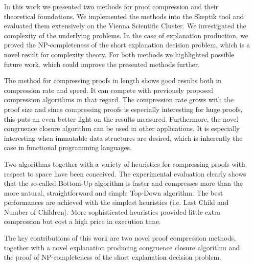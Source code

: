 
In this work we presented two methods for proof compression and their theoretical foundations.
We implemented the methods into the Skeptik tool and evaluated them extensively on the Vienna Scientific Cluster.
We investigated the complexity of the underlying problems.
In the case of explanation production, we proved the NP-completeness of the short explanation decision problem, which is a novel result for complexity theory.
For both methods we highlighted possible future work, which could improve the presented methods further.

The method for compressing proofs in length shows good results both in compression rate and speed.
It can compete with previously proposed compression algorithms in that regard.
The compression rate grows with the proof size and since compressing proofs is especially interesting for huge proofs, this puts an even better light on the results measured.
Furthermore, the novel congruence closure algorithm can be used in other applications.
It is especially interesting when immutable data structures are desired, which is inherently the case in functional programming languages.

Two algorithms together with a variety of heuristics for compressing proofs with respect to space have been conceived. 
The experimental evaluation clearly shows that the so-called Bottom-Up algorithm is faster and compresses more than the more natural, straightforward and simple Top-Down algorithm. 
The best performances are achieved with the simplest heuristics (i.e. Last Child and Number of Children). 
More sophisticated heuristics provided little extra compression but cost a high price in execution time. 

The key contributions of this work are two novel proof compression methods, together with a novel explanation producing congruence closure algorithm and the proof of NP-completeness of the short explanation decision problem.